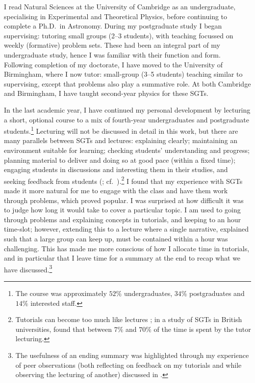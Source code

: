 I read Natural Sciences at the University of Cambridge as an undergraduate, specialising in Experimental and Theoretical Physics, before continuing to complete a Ph.D.\ in Astronomy. During my postgraduate study I began supervising: tutoring small groups (2--3 students), with teaching focussed on weekly (formative) problem sets. These had been an integral part of my undergraduate study, hence I was familiar with their function and form. Following completion of my doctorate, I have moved to the University of Birmingham, where I now tutor: small-group (3--5 students) teaching similar to supervising, except that problems also play a summative role. At both Cambridge and Birmingham, I have taught second-year physics for these SGTs.

In the last academic year, I have continued my personal development by lecturing a short, optional course to a mix of fourth-year undergraduates and postgraduate students.\footnote{The course was approximately $52\%$ undergraduates, $34\%$ postgraduates and $14\%$ interested staff.} Lecturing will not be discussed in detail in this work, but there are many parallels between SGTs and lectures: explaining clearly; maintaining an environment suitable for learning; checking students' understanding and progress; planning material to deliver and doing so at good pace (within a fixed time); engaging students in discussions and interesting them in their studies, and seeking feedback from students (\citealt[chapter 3]{Brown1988}; cf.\ \citealt[chapter 6]{Ramsden1992}).\footnote{Tutorials can become too much like lectures \citep[chapter 9]{Ramsden1992}; in a study of SGTs in British universities, \citet[quoted in \citealt{Brown1988}, chapter 4]{Luker1987} found that between $7\%$ and $70\%$ of the time is spent by the tutor lecturing.} I found that my experience with SGTs made it more natural for me to engage with the class and have them work through problems, which proved popular. I was surprised at how difficult it was to judge how long it would take to cover a particular topic. I am used to going through problems and explaining concepts in tutorials, and keeping to an hour time-slot; however, extending this to a lecture where a single narrative, explained such that a large group can keep up, must be contained within a hour was challenging. This has made me more conscious of how I allocate time in tutorials, and in particular that I leave time for a summary at the end to recap what we have discussed.\footnote{The usefulness of an ending summary was highlighted through my experience of peer observations (both reflecting on feedback on my tutorials and while observing the lecturing of another) discussed in .}

